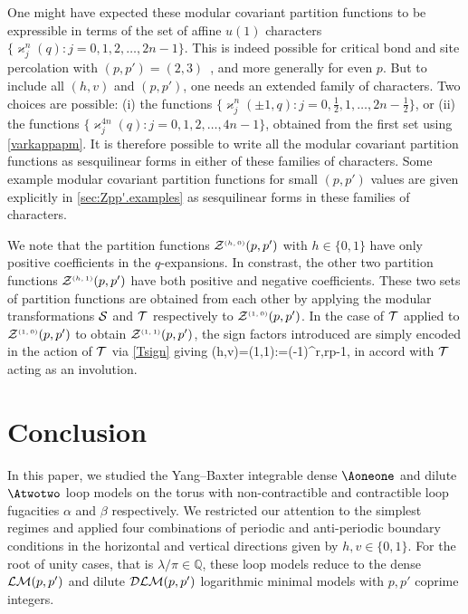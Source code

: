 \documentclass[11pt]{article}
\numberwithin{equation}{section}
\theoremstyle{definition}
\numberwithin{equation}{section}
\renewcommand{\le}{\leqslant}
\begin{document}
One might have expected these modular covariant partition functions to be expressible in terms of the set of affine $u(1)$ characters $\{\varkappa^n_j(q): j=0,1,2,\ldots,2n\!-\!1\}$. This is indeed possible for critical bond and site percolation with $(p,p')=(2,3)$~\cite{MDKP17,MDKP23}, and more generally for even $p$. But to include all $(h,v)$ and $(p,p')$, one needs an extended family of characters. Two choices are possible: (i) the functions $\{\varkappa^n_j(\pm 1,q): j=0,\frac12,1, \dots, 2n-\frac12\}$, or (ii) the functions $\{\varkappa^{4n}_j(q): j=0,1,2,\ldots,4n-1\}$, obtained from the first set using \eqref{varkappapm}. It is therefore possible to write all the modular covariant partition functions as sesquilinear forms in either of these families of characters. Some example modular covariant partition functions for small $(p,p')$ values are given explicitly in \cref{sec:Zpp'.examples} as sesquilinear forms in these families of characters.

We note that the partition functions $\mathcal Z^{\textrm{\tiny$(h,0)$}}(p,p')$ with $h\in \{0,1\}$ have only positive coefficients in the $q$-expansions. In constrast, the other two partition functions $\mathcal Z^{\textrm{\tiny$(h,1)$}}(p,p')$ have both positive and negative coefficients. These two sets of partition functions are obtained from each other by applying the modular transformations $\cal S$ and $\cal T$ respectively to $\mathcal Z^{\textrm{\tiny$(1,0)$}}(p,p')$. In the case of $\cal T$ applied to $\mathcal Z^{\textrm{\tiny$(1,0)$}}(p,p')$ to obtain $\mathcal Z^{\textrm{\tiny$(1,1)$}}(p,p')$, the sign factors introduced are simply encoded in the action of $\cal T$ via \eqref{Tsign} giving
\be
(h,v)=(1,1):\qquad \exp\!=(-1)^{r},\le r\le p-1,
\ee
in accord with $\cal T$ acting as an involution.

%
\section{Conclusion}\label{sec:conclusion}
%

In this paper, we studied the Yang--Baxter integrable dense $\Aoneone$ and dilute $\Atwotwo$ loop models on the torus with non-contractible and contractible loop fugacities $\alpha$ and $\beta$ respectively. We restricted our attention to the simplest regimes and
applied four combinations of periodic and anti-periodic boundary conditions in the horizontal and vertical directions given by $h,v\in\{0,1\}$. For the root of unity cases, that is $\lambda/\pi\in\mathbb Q$, these loop models reduce to the dense ${\cal LM}(p,p')$ and dilute ${\cal DLM}(p,p')$ logarithmic minimal models with $p,p'$ coprime integers. 
\end{document}
